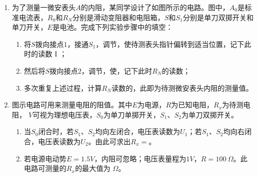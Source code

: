 

\begin{enumerate}[leftmargin=0em]
\renewcommand{\labelenumi}{\arabic{enumi}.}
\item
{}	
为了测量一微安表头$ A $的内阻，某同学设计了如图所示的电路。图中，$ A_{0} $是标准电流表，$ R_{0} $和$ R_N $分别是滑动变阻器和电阻箱，$ S $和$ S_{1} $分别是单刀双掷开关和单刀开关，$ E $是电池。完成下列实验步骤中的填空：
\begin{figure}[h!]
\centering

\end{figure}

\begin{enumerate}
\renewcommand{\labelenumi}{\arabic{enumi}.}
\item
将$ S $拨向接点$ 1 $，接通$ S_{1} $，调节，使待测表头指针偏转到适当位置，记下此时的读数 I ；
\item 
然后将$ S $拨向接点$ 2 $，调节，使，记下此时$ R_N $的读数；
\item 
多次重复上述过程，计算$ R_N $读数的，此即为待测微安表头内阻的测量值。



\end{enumerate}


\item 
{}
图示电路可用来测量电阻的阻值。其中$ E $为电源，$ R $为已知电阻，$ R_{x} $为待测电阻， $ V $可视为理想电压表，$ S_{0} $为单刀单掷开关，$ S_{1} $、$ S_{2} $为单刀双掷开关。
\begin{figure}[h!]
\centering

\end{figure}

\begin{enumerate}
\renewcommand{\labelenumi}{\arabic{enumi}.}
\item
当$ S_{0} $闭合时，若$ S_{1} $、$ S_{2} $均向左闭合，电压表读数为$ U_{1} $；若$ S_{1} $、$ S_{2} $均向右闭合，电压表读数为$ U_{2} $。由此可求出$ R_{x} = $。
\item 
若电源电动势$ E=1.5V $，内阻可忽略；电压表量程为$ 1V $，$ R=100 \ \Omega $。此电路可测量的$ R_{x} $的最大值为 $ \Omega $。




\end{enumerate}
\end{enumerate}
